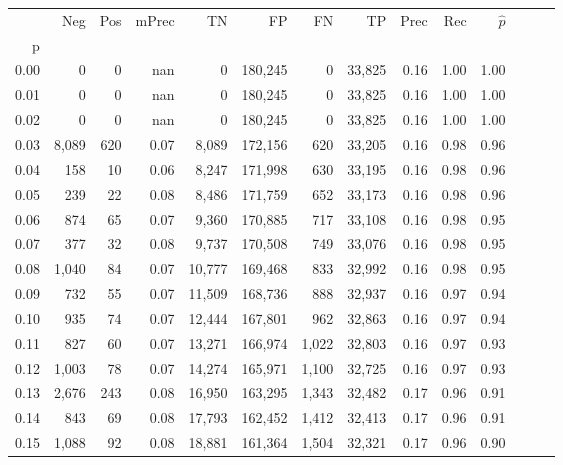 \begin{tabular}{rrrrrrrrrrrrrr}
\toprule
{} &    Neg &  Pos & mPrec &       TN &       FP &      FN &      TP &  Prec &   Rec & $\hat{p}$ \\
p    &        &      &       &          &          &         &         &       &       &           \\
\midrule
0.00 &      0 &    0 &   nan &        0 &  180,245 &       0 &  33,825 &  0.16 &  1.00 &      1.00 \\
0.01 &      0 &    0 &   nan &        0 &  180,245 &       0 &  33,825 &  0.16 &  1.00 &      1.00 \\
0.02 &      0 &    0 &   nan &        0 &  180,245 &       0 &  33,825 &  0.16 &  1.00 &      1.00 \\
0.03 &  8,089 &  620 &  0.07 &    8,089 &  172,156 &     620 &  33,205 &  0.16 &  0.98 &      0.96 \\
0.04 &    158 &   10 &  0.06 &    8,247 &  171,998 &     630 &  33,195 &  0.16 &  0.98 &      0.96 \\
0.05 &    239 &   22 &  0.08 &    8,486 &  171,759 &     652 &  33,173 &  0.16 &  0.98 &      0.96 \\
0.06 &    874 &   65 &  0.07 &    9,360 &  170,885 &     717 &  33,108 &  0.16 &  0.98 &      0.95 \\
0.07 &    377 &   32 &  0.08 &    9,737 &  170,508 &     749 &  33,076 &  0.16 &  0.98 &      0.95 \\
0.08 &  1,040 &   84 &  0.07 &   10,777 &  169,468 &     833 &  32,992 &  0.16 &  0.98 &      0.95 \\
0.09 &    732 &   55 &  0.07 &   11,509 &  168,736 &     888 &  32,937 &  0.16 &  0.97 &      0.94 \\
0.10 &    935 &   74 &  0.07 &   12,444 &  167,801 &     962 &  32,863 &  0.16 &  0.97 &      0.94 \\
0.11 &    827 &   60 &  0.07 &   13,271 &  166,974 &   1,022 &  32,803 &  0.16 &  0.97 &      0.93 \\
0.12 &  1,003 &   78 &  0.07 &   14,274 &  165,971 &   1,100 &  32,725 &  0.16 &  0.97 &      0.93 \\
0.13 &  2,676 &  243 &  0.08 &   16,950 &  163,295 &   1,343 &  32,482 &  0.17 &  0.96 &      0.91 \\
0.14 &    843 &   69 &  0.08 &   17,793 &  162,452 &   1,412 &  32,413 &  0.17 &  0.96 &      0.91 \\
0.15 &  1,088 &   92 &  0.08 &   18,881 &  161,364 &   1,504 &  32,321 &  0.17 &  0.96 &      0.90 \\

\end{tabular}
